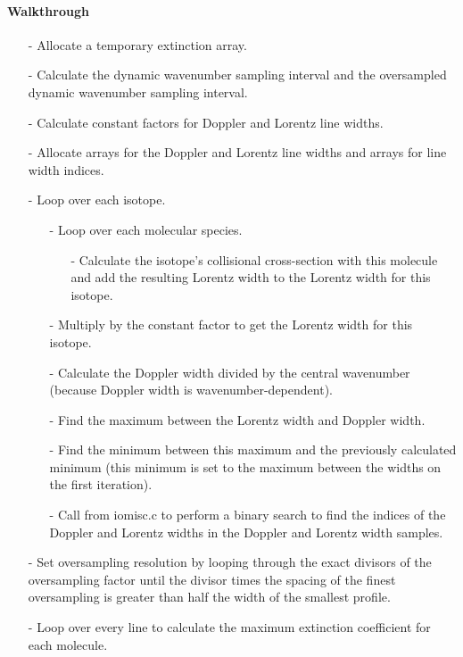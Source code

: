 \documentclass[letterpaper,12pt]{article}
\begin{document}
\paragraph{Walkthrough}
\begin{enumerate}[leftmargin=10pt, noitemsep, parsep=0pt, topsep=0ex]
\item[-] Allocate a temporary extinction array.
\item[-] Calculate the dynamic wavenumber sampling interval and the oversampled dynamic wavenumber sampling interval.
\item[-] Calculate constant factors for Doppler and Lorentz line widths.
\item[-] Allocate arrays for the Doppler and Lorentz line widths and arrays for line width indices.
\item[-] Loop over each isotope.
\begin{enumerate}[leftmargin=10pt, noitemsep, parsep=0pt, topsep=0ex]
\item[-] Loop over each molecular species.
\begin{enumerate}[leftmargin=10pt, noitemsep, parsep=0pt, topsep=0ex]
\item[-] Calculate the isotope's collisional cross-section with this molecule and add the resulting Lorentz width to the Lorentz width for this isotope.
\end{enumerate}
\item[-] Multiply by the constant factor to get the Lorentz width for this isotope.
\item[-] Calculate the Doppler width divided by the central wavenumber (because Doppler width is wavenumber-dependent).
\item[-] Find the maximum between the Lorentz width and Doppler width.
\item[-] Find the minimum between this maximum and the previously calculated minimum (this minimum is set to the maximum between the widths on the first iteration).
\item[-] Call  from iomisc.c to perform a binary search to find the indices of the Doppler and Lorentz widths in the Doppler and Lorentz width samples.
\end{enumerate}
\item[-] Set oversampling resolution by looping through the exact divisors of the oversampling factor until the divisor times the spacing of the finest oversampling is greater than half the width of the smallest profile.
\item[-] Loop over every line to calculate the maximum extinction coefficient for each molecule.

\end{enumerate}
\end{document}
